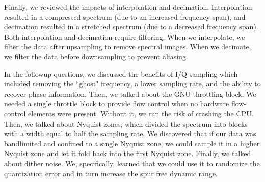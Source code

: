 \documentclass{article}
\begin{document}
Finally, we reviewed the impacts of interpolation and decimation. Interpolation resulted in a compressed spectrum (due to an increased frequency span), and decimation resulted in a stretched spectrum (due to a decreased frequency span). Both interpolation and decimation require filtering. When we interpolate, we filter the data after upsampling to remove spectral images. When we decimate, we filter the data before downsampling to prevent aliasing.

In the followup questions, we discussed the benefits of I/Q sampling which included removing the ``ghost" frequency, a lower sampling rate, and the ability to recover phase information. Then, we talked about the GNU throttling block. We needed a single throttle block to provide flow control when no hardware flow-control elements were present. Without it, we ran the risk of crashing the CPU. Then, we talked about Nyquist zones, which divided the spectrum into blocks with a width equal to half the sampling rate. We discovered that if our data was bandlimited and confined to a single Nyquist zone, we could sample it in a higher Nyquist zone and let it fold back into the first Nyquist zone. Finally, we talked about dither noise. We, specifically, learned that we could use it to randomize the quantization error and in turn increase the spur free dynamic range.


\end{document}
